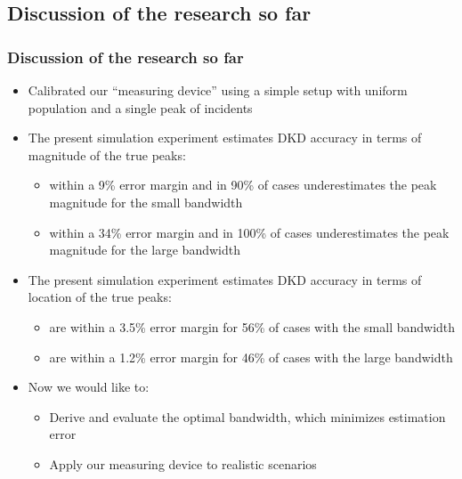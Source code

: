 \documentclass{beamer}
\theoremstyle{definition}
\begin{document}
\subsection{Discussion of the research so far}
\begin{frame}\frametitle{Discussion of the research so far}
    \footnotesize
    \begin{itemize}
        \item Calibrated our ``measuring device'' using a simple setup with uniform population and a single peak of incidents
        \item The present simulation experiment estimates DKD accuracy in terms of magnitude of the true peaks:
        \begin{itemize}
            \scriptsize
            \item within a 9\% error margin and in 90\% of cases underestimates the peak magnitude for the small bandwidth
            \item within a 34\% error margin and in 100\% of cases underestimates the peak magnitude for the large bandwidth
        \end{itemize}
        \item The present simulation experiment estimates DKD accuracy in terms of location of the true peaks:
        \begin{itemize}
            \scriptsize
            \item are within a 3.5\% error margin for 56\% of cases with the small bandwidth
            \item are within a 1.2\% error margin for 46\% of cases with the large bandwidth
        \end{itemize}
        \item Now we would like to:
        \begin{itemize}
            \scriptsize
            \item Derive and evaluate the optimal bandwidth, which minimizes estimation error
            \item Apply our measuring device to realistic scenarios
        \end{itemize}
    \end{itemize}
\end{frame}

\end{document}
